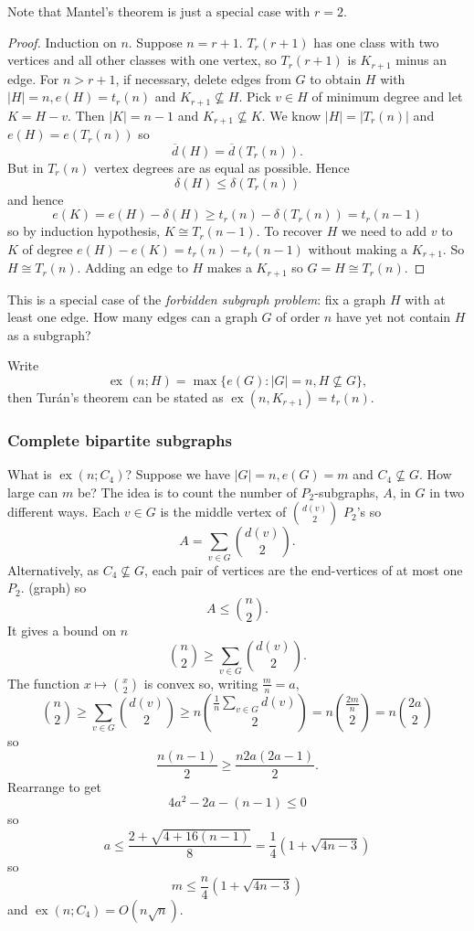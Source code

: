 \documentclass[a4paper]{article}
\DeclareMathOperator{\exx}{ex} %
\begin{document}
Note that Mantel's theorem is just a special case with \(r = 2\).

\begin{proof}
  Induction on \(n\). Suppose \(n = r + 1\). \(T_r(r + 1)\) has one class with two vertices and all other classes with one vertex, so \(T_r(r + 1)\) is \(K_{r + 1}\) minus an edge. For \(n > r + 1\), if necessary, delete edges from \(G\) to obtain \(H\) with \(|H| = n, e(H) = t_r(n)\) and \(K_{r + 1} \nsubseteq H\). Pick \(v \in H\) of minimum degree and let \(K = H - v\). Then \(|K| = n - 1\) and \(K_{r + 1} \nsubseteq K\). We know \(|H| = |T_r(n)|\) and \(e(H) = e(T_r(n))\) so
  \[
    \overline d(H) = \overline d(T_r(n)).
  \]
  But in \(T_r(n)\) vertex degrees are as equal as possible. Hence
  \[
    \delta(H) \leq \delta(T_r(n))
  \]
  and hence
  \[
    e(K) = e(H) - \delta(H) \geq t_r(n) - \delta(T_r(n)) = t_r(n - 1)
  \]
  so by induction hypothesis, \(K \cong T_r(n - 1)\). To recover \(H\) we need to add \(v\) to \(K\) of degree \(e(H) - e(K) = t_r(n) - t_r(n - 1)\) without making a \(K_{r + 1}\). So \(H \cong T_r(n)\). Adding an edge to \(H\) makes a \(K_{r + 1}\) so \(G = H \cong T_r(n)\).
\end{proof}

This is a special case of the \emph{forbidden subgraph problem}: fix a graph \(H\) with at least one edge. How many edges can a graph \(G\) of order \(n\) have yet not contain \(H\) as a subgraph?

Write
\[
  \exx(n; H) = \max \{e(G): |G| = n, H \nsubseteq G\},
\]
then Turán's theorem can be stated as \(\exx(n, K_{r + 1}) = t_r(n)\).

\subsubsection{Complete bipartite subgraphs}

What is \(\exx(n; C_4)\)? Suppose we have \(|G| = n, e(G) = m\) and \(C_4 \nsubseteq G\). How large can \(m\) be? The idea is to count the number of \(P_2\)-subgraphs, \(A\), in \(G\) in two different ways. Each \(v \in G\) is the middle vertex of \(\binom{d(v)}{2}\) \(P_2\)'s so
\[
  A = \sum_{v \in G} \binom{d(v)}{2}.
\]
Alternatively, as \(C_4 \nsubseteq G\), each pair of vertices are the end-vertices of at most one \(P_2\). (graph) so
\[
  A \leq \binom{n}{2}.
\]
It gives a bound on \(n\)
\[
  \binom{n}{2} \geq \sum_{v \in G} \binom{d(v)}{2}.
\]
The function \(x \mapsto \binom{x}{2}\) is convex so, writing \(\frac{m}{n} = a\),
\[
  \binom{n}{2} \geq \sum_{v \in G} \binom{d(v)}{2}
  \geq n \binom{\frac{1}{n} \sum_{v \in G} d(v)}{2}
  = n \binom{\frac{2m}{n}}{2}
  = n \binom{2a}{2}
\]
so
\[
  \frac{n(n - 1)}{2} \geq \frac{n 2a (2 a - 1)}{2}.
\]
Rearrange to get
\[
  4a^2 - 2a - (n - 1) \leq 0
\]
so
\[
  a \leq \frac{2 + \sqrt{4 + 16 (n - 1)}}{8} = \frac{1}{4}(1 + \sqrt{4n - 3})
\]
so
\[
  m \leq \frac{n}{4} (1 + \sqrt{4n - 3})
\]
and \(\exx(n; C_4) = O(n \sqrt n)\).
\end{document}
